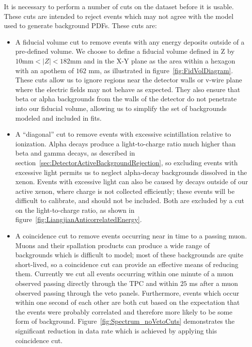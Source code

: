 It is necessary to perform a number of cuts on the dataset before it is usable.  These cuts are intended to reject events which may not agree with the model used to generate background PDFs.  These cuts are:~\cite{FittingDocument}
\begin{itemize}
\item A fiducial volume cut to remove events with any energy deposits outside of a pre-defined volume.  We choose to define a fiducial volume defined in Z by $10 \text{mm} < |Z| < 182 \text{mm}$ and in the X-Y plane as the area within a hexagon with an apothem of $162$ mm, as illustrated in figure~\ref{fig:FidVolDiagram}.  These cuts allow us to ignore regions near the detector walls or v-wire plane where the electric fields may not behave as expected.  They also ensure that beta or alpha backgrounds from the walls of the detector do not penetrate into our fiducial volume, allowing us to simplify the set of backgrounds modeled and included in fits.
\item A ``diagonal'' cut to remove events with excessive scintillation relative to ionization.  Alpha decays produce a light-to-charge ratio much higher than beta and gamma decays, as described in section~\ref{sec:DetectorActiveBackgroundRejection}, so excluding events with excessive light permits us to neglect alpha-decay backgrounds dissolved in the xenon.  Events with excessive light can also be caused by decays outside of our active xenon, where charge is not collected efficiently; these events will be difficult to calibrate, and should not be included.  Both are excluded by a cut on the light-to-charge ratio, as shown in figure~\ref{fig:LiangjianAnticorrelatedEnergy}.
\item A coincidence cut to remove events occurring near in time to a passing muon.  Muons and their spallation products can produce a wide range of backgrounds which is difficult to model; most of these backgrounds are quite short-lived, so a coincidence cut can provide an effective means of reducing them.  Currently we cut all events occurring within one minute of a muon observed passing directly through the TPC and within $25$ ms after a muon observed passing through the veto panels.  Furthermore, events which occur within one second of each other are both cut based on the expectation that the events were probably correlated and therefore more likely to be some form of background.  Figure~\ref{fig:Spectrum_noVetoCuts} demonstrates the significant reduction in data rate which is achieved by applying this coincidence cut.
\end{itemize}

